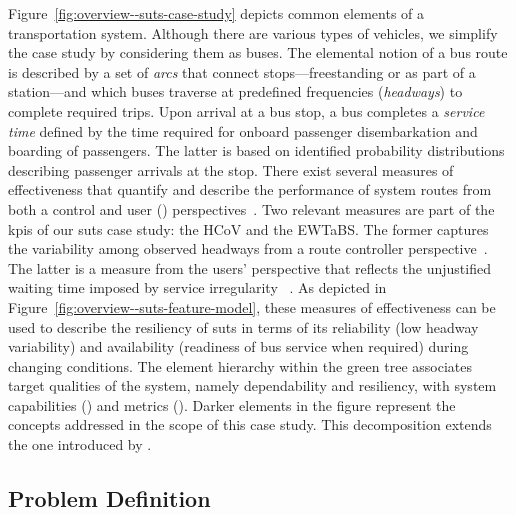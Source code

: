 Figure~\ref{fig:overview--suts-case-study} depicts common elements of a transportation system. Although there are various types of vehicles, we simplify the case study by considering them as buses. The elemental notion of a bus route is described by a set of \textit{arcs} that connect stops---freestanding or as part of a station---and which buses traverse at predefined frequencies (\ie \textit{headways}) to complete required trips. Upon arrival at a bus stop, a bus completes a \textit{service time} defined by the time required for onboard passenger disembarkation and boarding of passengers. The latter is based on identified probability distributions describing passenger arrivals at the stop. There exist several measures of effectiveness that quantify and describe the performance of system routes from both a control and user () perspectives~\cite{hounsell-1998-automatic,strathman-1999-automated,chandrasekar-2002-simulation}. Two relevant measures are part of the \glspl{kpi} of our \gls{suts} case study: the \gls{HCoV} and the \gls{EWTaBS}. The former captures the variability among observed headways from a route controller perspective~\cite{strathman-1999-automated,chandrasekar-2002-simulation}. The latter is a measure from the users' perspective that reflects the unjustified waiting time imposed by service irregularity ~\cite{strathman-1999-automated,hounsell-1998-automatic}. As depicted in Figure~\ref{fig:overview--suts-feature-model}, these measures of effectiveness can be used to describe the resiliency of \gls{suts} in terms of its reliability (\ie low headway variability) and availability (\ie readiness of bus service when required) during changing conditions. The element hierarchy within the green tree associates target qualities of the system, namely dependability and resiliency, with system capabilities () and metrics (). Darker elements in the figure represent the concepts addressed in the scope of this case study. This decomposition extends the one introduced by \cite{bennaceur-2019-modelling}.

\subsection{Problem Definition}
\label{subsect:overview--suts-case-study-problem}

